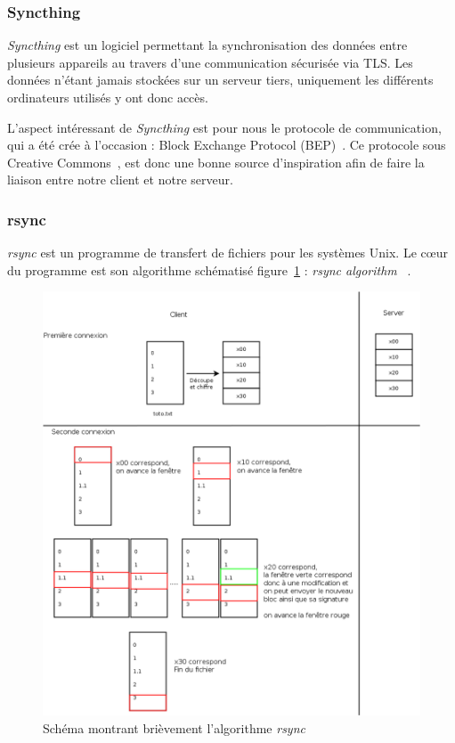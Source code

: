 \documentclass[a4paper,10pt, twoside]{report}
\begin{document}
\begin{spacing}{1.2}
\subsubsection{Syncthing}
\textit{Syncthing} est un logiciel permettant la synchronisation des données
entre plusieurs appareils au travers d'une communication sécurisée via TLS.
Les données n'étant jamais stockées sur un serveur tiers, uniquement les
différents ordinateurs utilisés y ont donc accès.

L'aspect intéressant de \textit{Syncthing} est pour nous le protocole de
communication, qui a été crée à l'occasion : Block Exchange Protocol
(BEP)~\cite{refBEP}. Ce protocole sous Creative Commons~\cite{refCC4.0}, est
donc une bonne source d'inspiration afin de faire la liaison entre notre client
et notre serveur.

\subsubsection{rsync}
\textit{rsync} est un programme de transfert de fichiers pour les systèmes
Unix. Le c\oe ur du programme est son algorithme schématisé
figure~\ref{rsyncAlgo} :
\textit{\flqq rsync algorithm \frqq}~\cite{refRsyncAlgo}.

\begin{figure}[h!]
    \centering
    \includegraphics[width=15cm]{algo/rsyncalgo.png}
    \caption{\label{rsyncAlgo} Schéma montrant brièvement
    l'algorithme \textit{rsync}}
\end{figure}


\end{spacing}
\end{document}
